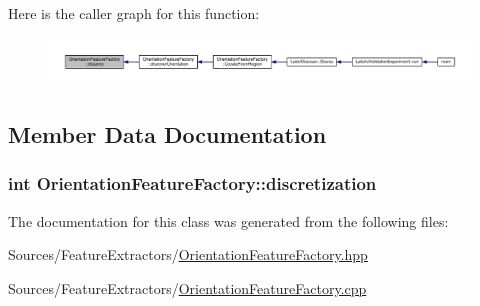 Here is the caller graph for this function\+:
\nopagebreak
\begin{figure}[H]
\begin{center}
\leavevmode
\includegraphics[width=350pt]{class_orientation_feature_factory_a68e87a390c95060cac05065757daa18d_icgraph}
\end{center}
\end{figure}




\subsection{Member Data Documentation}
\hypertarget{class_orientation_feature_factory_abcd8932fe77877dff6657e4070882015}{
\subsubsection[{discretization}]{\setlength{\rightskip}{0pt plus 5cm}int Orientation\+Feature\+Factory\+::discretization\hspace{0.3cm}{\ttfamily [private]}}}\label{class_orientation_feature_factory_abcd8932fe77877dff6657e4070882015}


The documentation for this class was generated from the following files\+:\begin{DoxyCompactItemize}
\item 
Sources/\+Feature\+Extractors/\hyperlink{_orientation_feature_factory_8hpp}{Orientation\+Feature\+Factory.\+hpp}\item 
Sources/\+Feature\+Extractors/\hyperlink{_orientation_feature_factory_8cpp}{Orientation\+Feature\+Factory.\+cpp}\end{DoxyCompactItemize}
